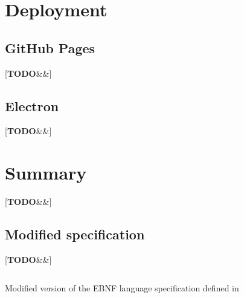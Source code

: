 \documentclass[english,engineering]{wizthesis}
\newcommand{\todo}[1]{%
  {\color{red}[\textbf{TODO}\ifx&#1&{}\else{ }\fi\emph{#1}]}%
}
\begin{document}
\chapter{Deployment}

\section{GitHub Pages}

\todo{}

\section{Electron}

\todo{}

{\backmatter %
\chapter{Summary}

\todo{}
}



\listoffigures

\listoftables

\listoflistings

\begin{appendices}

\chapter{Modified specification} \label{ch:modified-spec}

\todo{}

\begin{listing}[H]
  \inputminted[fontsize=\small,frame=single,breaklines,linenos]
    {lexers/ebnf_lexer.py:EbnfLexer -x}{listings/specification.ebnf}
  \caption{Modified version of the EBNF language specification defined in
  \cite{iso-14977}}
  \label{lst:specification}
\end{listing}

\end{appendices}
\end{document}
